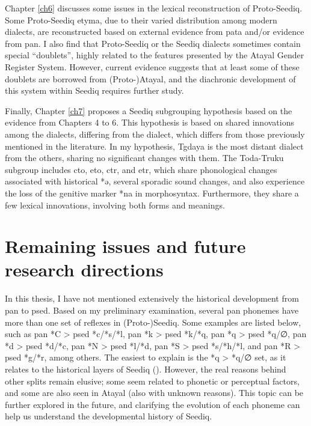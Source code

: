 Chapter \ref{ch6} discusses some issues in the lexical reconstruction of Proto-Seediq. Some Proto-Seediq etyma, due to their varied distribution among modern dialects, are reconstructed based on external evidence from \acl{pata} and/or evidence from \acl{pan}. I also find that Proto-Seediq or the Seediq dialects sometimes contain special ``doublets'', highly related to the features presented by the Atayal Gender Register System. However, current evidence suggests that at least some of these doublets are borrowed from (Proto-)Atayal, and the diachronic development of this system within Seediq requires further study.

Finally, Chapter \ref{ch7} proposes a Seediq subgrouping hypothesis based on the evidence from Chapters 4 to 6. This hypothesis is based on shared innovations among the dialects, differing from the dialect, which differs from those previously mentioned in the literature. In my hypothesis, Tgdaya is the most distant dialect from the others, sharing no significant changes with them. The Toda-Truku subgroup includes \acl{cto}, \acl{eto}, \acl{ctr}, and \acl{etr}, which share phonological changes associated with historical *ə, several sporadic sound changes, and also experience the loss of the genitive marker *na in morphosyntax. Furthermore, they share a few lexical innovations, involving both forms and meanings.

\section{Remaining issues and future research directions}

In this thesis, I have not mentioned extensively the historical development from \acl{pan} to \acl{psed}. Based on my preliminary examination, several \ac{pan} phonemes have more than one set of reflexes in (Proto-)Seediq. Some examples are listed below, such as \ac{pan} *C > \ac{psed} *c/*s/*l, \ac{pan} *k > \ac{psed} *k/*q, \ac{pan} *q > \ac{psed} *q/∅, \ac{pan} *d > \ac{psed} *d/*c, \ac{pan} *N > \ac{psed} *l/*d, \ac{pan} *S > \ac{psed} *s/*h/*l, and \ac{pan} *R > \ac{psed} *g/*r, among others. The easiest to explain is the *q > *q/∅ set, as it relates to the historical layers of Seediq (\cite{song2024sedq}). However, the real reasons behind other splits remain elusive; some seem related to phonetic or perceptual factors, and some are also seen in Atayal (also with unknown reasons). This topic can be further explored in the future, and clarifying the evolution of each phoneme can help us understand the developmental history of Seediq.


